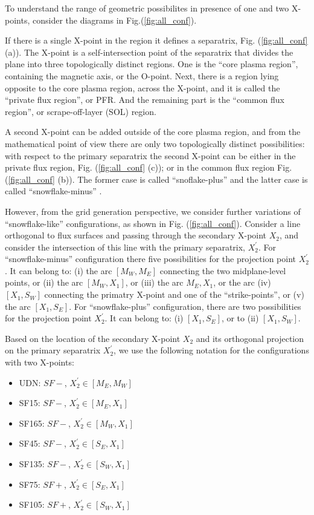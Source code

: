To understand the range of geometric possibilites in presence of one
and two X-points, consider the diagrams in Fig.(\ref{fig:all_conf}).

If there is a single X-point in the region it defines a separatrix,
Fig. (\ref{fig:all_conf} (a)). The X-point is a self-intersection
point of the separatrix that divides the plane into three
topologically distinct regions. One is the ``core plasma region'',
containing the magnetic axis, or the O-point. Next, there is a region
lying opposite to the core plasma region, across the X-point, and it
is called the ``private flux region'', or PFR. And the remaining part
is the ``common flux region'', or scrape-off-layer (SOL) region.

A second X-point can be added outside of the core plasma region, and
from the mathematical point of view there are only two topologically
distinct possibilities: with respect to the primary separatrix the
second X-point can be either in the private flux region,
Fig. (\ref{fig:all_conf} (c)); or in the common flux region
Fig. (\ref{fig:all_conf} (b)). The former case is called
``snoflake-plus'' and the latter case is called ``snowflake-minus''
\cite{}.

However, from the grid generation perspective, we consider further
variations of ``snowflake-like'' configurations, as shown in
Fig. (\ref{fig:all_conf}). Consider a line orthogonal to flux surfaces
and passing through the secondary X-point $X_2$, and consider the
intersection of this line with the primary separatrix,
$X^{\prime}_2$. For ``snowflake-minus'' configuration there five
possibilities for the projection point $X^{\prime}_2$. It can belong
to: (i) the arc $[M_W,M_E]$ connecting the two midplane-level points,
or (ii) the arc $[M_W,X_1]$, or (iii) the arc $M_E,X_1$, or the arc
(iv) $[X_1,S_W]$ connecting the primatry X-point and one of the
``strike-points'', or (v) the arc $[X_1,S_E]$. For ``snowflake-plus''
configuration, there are two possibilities for the projection point
$X^{\prime}_2$. It can belong to: (i) $[X_1,S_E]$, or to (ii)
$[X_1,S_W]$.

Based on the location of the secondary X-point $X_2$ and its
orthogonal projection on the primary separatrix $X_2^{\prime}$, we use
the following notation for the configurations with two X-points:

\begin{itemize}
	\item UDN: $SF-$, $X^{\prime}_2 \in [M_E,M_W]$
	\item SF15: $SF-$, $X^{\prime}_2 \in [M_E,X_1]$
	\item SF165: $SF-$, $X^{\prime}_2 \in [M_W,X_1]$
        \item SF45: $SF-$, $X^{\prime}_2 \in [S_E,X_1]$
        \item SF135: $SF-$, $X^{\prime}_2 \in [S_W,X_1]$
        \item SF75: $SF+$, $X^{\prime}_2 \in [S_E,X_1]$
        \item SF105: $SF+$, $X^{\prime}_2 \in [S_W,X_1]$
\end{itemize}

